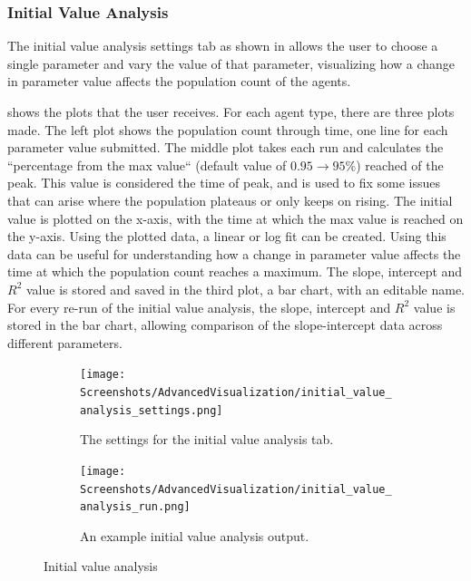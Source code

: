 \subsubsection{Initial Value Analysis}
\label{sec:initial_value_analysis}
The initial value analysis settings tab as shown in  allows the user to choose a single parameter and vary the value of that parameter, visualizing how a change in parameter value affects the population count of the agents.

 shows the plots that the user receives.
For each agent type, there are three plots made.
The left plot shows the population count through time, one line for each parameter value submitted.
The middle plot takes each run and calculates the “percentage from the max value“ (default value of $0.95 \rightarrow 95\%$) reached of the peak.
This value is considered the time of peak, and is used to fix some issues that can arise where the population plateaus or only keeps on rising.
The initial value is plotted on the x-axis, with the time at which the max value is reached on the y-axis.
Using the plotted data, a linear or log fit can be created.
Using this data can be useful for understanding how a change in parameter value affects the time at which the population count reaches a maximum.
The slope, intercept and $R^2$ value is stored and saved in the third plot, a bar chart, with an editable name.
For every re-run of the initial value analysis, the slope, intercept and $R^2$ value is stored in the bar chart, allowing comparison of the slope-intercept data across different parameters. 

\begin{figure}[h!]
    \centering
    \begin{subfigure}{0.49\linewidth}
        \centering
        \vspace*{\fill}
        \texttt{[image: Screenshots/AdvancedVisualization/initial\_value\_analysis\_settings.png]}
        \caption{
            The settings for the initial value analysis tab. 
        }
        \label{fig:ss:av:initial_value_analysis_settings}
        \vspace*{\fill}
    \end{subfigure}
    \hfill
    \begin{subfigure}{0.49\linewidth}
        \centering
        \vspace*{\fill}
        \texttt{[image: Screenshots/AdvancedVisualization/initial\_value\_analysis\_run.png]}
        \caption{
            An example initial value analysis output. 
        }
        \label{fig:ss:av:initial_value_analysis_run}
        \vspace*{\fill}
    \end{subfigure}
    \caption{Initial value analysis}
\end{figure}

